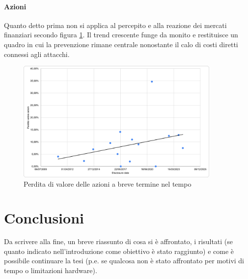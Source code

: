 \documentclass[12pt,a4paper,openright,twoside]{report}
\begin{document}
\subsubsection{Azioni}
Quanto detto prima non si applica al percepito e alla reazione dei mercati finanziari secondo figura \ref{fig:stockloss}. Il trend crescente funge da monito e restituisce un quadro in cui la prevenzione rimane centrale nonostante il calo di costi diretti connessi agli attacchi.\\
\begin{figure}[H]
    \centering
    \includegraphics[width=10cm]{figures/stocks-date.png}
    \caption{Perdita di valore delle azioni a breve termine nel tempo}
    \label{fig:stockloss}
\end{figure}

\clearpage{\pagestyle{empty}\cleardoublepage}



\chapter{Conclusioni}

Da scrivere alla fine, un breve riassunto di cosa si \`e affrontato, i risultati (se quanto indicato nell'introduzione come obiettivo \`e stato raggiunto) e come \`e possibile continuare la tesi (p.e. se qualcosa non \`e stato affrontato per motivi di tempo o limitazioni hardware).



\clearpage{\pagestyle{empty}\cleardoublepage}



\label{Bibliography}


\end{document}
